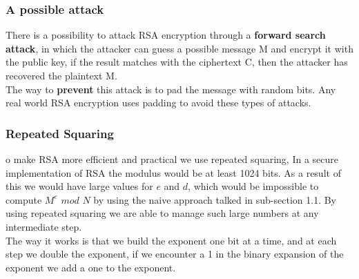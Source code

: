 \documentclass[a4paper]{article}
\begin{document}
\subsubsection{A possible attack}
There is a possibility to attack RSA encryption through a \textbf{forward search attack}, in which the attacker can guess a possible message M and encrypt it with the public key, if the result matches with the ciphertext C, then the attacker has recovered the plaintext M.\\
The way to \textbf{prevent} this attack is to pad the message with random bits. Any real world RSA encryption uses padding to avoid these types of attacks.

\subsubsection{Repeated Squaring}
o make RSA more efficient and practical we use repeated squaring, In a secure implementation of RSA the modulus would be at least 1024 bits. As a result of this we would have large values for $e$ and $d$, which would be impossible to compute $M^e$ $mod$ $N$ by using the naive approach talked in sub-section 1.1. By using repeated squaring we are able to manage such large numbers at any intermediate step.\\
The way it works is that we build the exponent one bit at a time, and at each step we double the exponent, if we encounter a 1 in the binary expansion of the exponent we add a one to the exponent.
\end{document}
